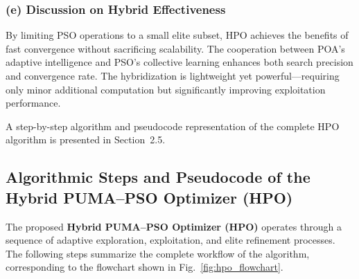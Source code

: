 \documentclass[a4paper,12pt]{article}
\begin{document}

\subsubsection*{(e) Discussion on Hybrid Effectiveness}
By limiting PSO operations to a small elite subset, HPO achieves the benefits of fast convergence without sacrificing scalability. The cooperation between POA’s adaptive intelligence and PSO’s collective learning enhances both search precision and convergence rate. The hybridization is lightweight yet powerful—requiring only minor additional computation but significantly improving exploitation performance.

\vspace{0.5em}
A step-by-step algorithm and pseudocode representation of the complete HPO algorithm is presented in Section~2.5.

\subsection{Algorithmic Steps and Pseudocode of the Hybrid PUMA--PSO Optimizer (HPO)}

The proposed \textbf{Hybrid PUMA--PSO Optimizer (HPO)} operates through a sequence of adaptive exploration, exploitation, and elite refinement processes. The following steps summarize the complete workflow of the algorithm, corresponding to the flowchart shown in Fig.~\ref{fig:hpo_flowchart}.
\end{document}
